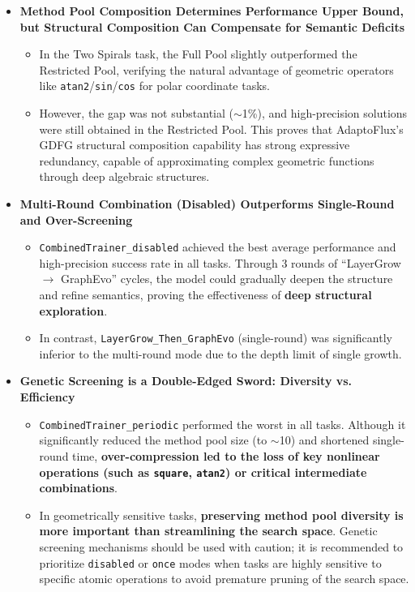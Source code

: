 \begin{itemize}
    \item \textbf{Method Pool Composition Determines Performance Upper Bound, but Structural Composition Can Compensate for Semantic Deficits}
    \begin{itemize}
        \item In the Two Spirals task, the Full Pool slightly outperformed the Restricted Pool, verifying the natural advantage of geometric operators like \texttt{atan2}/\texttt{sin}/\texttt{cos} for polar coordinate tasks.
        \item However, the gap was not substantial ($\sim$1\%), and high-precision solutions were still obtained in the Restricted Pool. This proves that AdaptoFlux's GDFG structural composition capability has strong expressive redundancy, capable of approximating complex geometric functions through deep algebraic structures.
    \end{itemize}
    
    \item \textbf{Multi-Round Combination (Disabled) Outperforms Single-Round and Over-Screening}
    \begin{itemize}
        \item \texttt{CombinedTrainer\_disabled} achieved the best average performance and high-precision success rate in all tasks. Through 3 rounds of ``LayerGrow $\rightarrow$ GraphEvo'' cycles, the model could gradually deepen the structure and refine semantics, proving the effectiveness of \textbf{deep structural exploration}.
        \item In contrast, \texttt{LayerGrow\_Then\_GraphEvo} (single-round) was significantly inferior to the multi-round mode due to the depth limit of single growth.
    \end{itemize}
    
    \item \textbf{Genetic Screening is a Double-Edged Sword: Diversity vs. Efficiency}
    \begin{itemize}
        \item \texttt{CombinedTrainer\_periodic} performed the worst in all tasks. Although it significantly reduced the method pool size (to $\sim$10) and shortened single-round time, \textbf{over-compression led to the loss of key nonlinear operations (such as \texttt{square}, \texttt{atan2}) or critical intermediate combinations}.
        \item In geometrically sensitive tasks, \textbf{preserving method pool diversity is more important than streamlining the search space}. Genetic screening mechanisms should be used with caution; it is recommended to prioritize \texttt{disabled} or \texttt{once} modes when tasks are highly sensitive to specific atomic operations to avoid premature pruning of the search space.
    \end{itemize}
    

\end{itemize}
